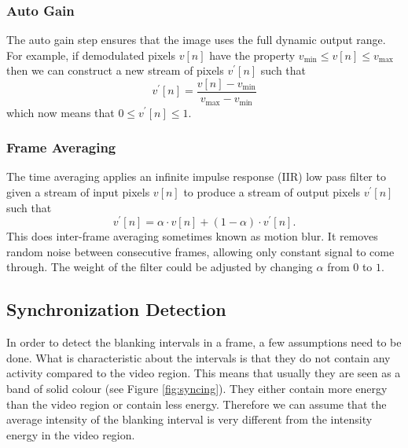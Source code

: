 \documentclass[a4paper,12pt,twoside,openright]{report}
\begin{document}
\subsubsection{Auto Gain}

The auto gain step ensures that the image uses the full dynamic output range. For example, if demodulated pixels $v[n]$ have the property $v_\text{min} \leq v[n] \leq v_\text{max}$ then we can construct a new stream of pixels $v^{\prime}[n]$ such that
$$v^{\prime}[n] = \frac{v[n] - v_\text{min}}{v_\text{max} - v_\text{min}}$$
which now means that $0 \leq v^{\prime}[n] \leq 1$.

\subsubsection{Frame Averaging}

The time averaging applies an infinite impulse response (IIR) low pass filter to given a stream of input pixels $v[n]$ to produce a stream of output pixels $v^{\prime}[n]$ such that
$$v^{\prime}[n] =  \alpha \cdot v[n] + (1 - \alpha) \cdot v^{\prime}[n].$$
This does inter-frame averaging sometimes known as motion blur. It removes random noise between consecutive frames, allowing only constant signal to come through. The weight of the filter could be adjusted by changing $\alpha$ from $0$ to $1$.

\subsection{Synchronization Detection}

In order to detect the blanking intervals in a frame, a few assumptions need to be done. What is characteristic about the intervals is that they do not contain any activity compared to the video region. This means that usually they are seen as a band of solid colour (see Figure \ref{fig:syncing}). They either contain more energy than the video region or contain less energy. Therefore we can assume that the average intensity of the blanking interval is very different from the intensity energy in the video region.
\end{document}
